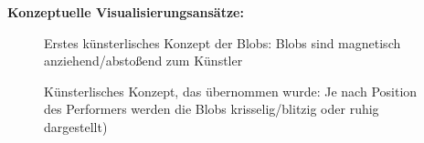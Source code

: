 \textbf{Konzeptuelle Visualisierungsansätze:}

\begin{figure}[htbp]
    \centering
    \caption{Erstes künsterlisches Konzept der Blobs: Blobs sind magnetisch anziehend/abstoßend zum Künstler}
    \label{fig:scaling_concept}
\end{figure}

\begin{figure}[htbp]
    \centering
    \caption{Künsterlisches Konzept, das übernommen wurde: Je nach Position des Performers werden die Blobs krisselig/blitzig oder ruhig dargestellt)}
    \label{fig:external_positioning}
\end{figure}

